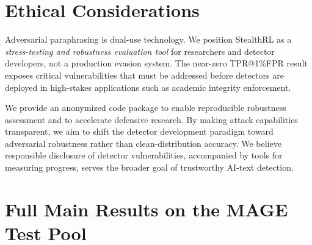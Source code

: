 \documentclass[11pt]{article}
\begin{document}
\section{Ethical Considerations}

Adversarial paraphrasing is dual-use technology. We position StealthRL as a \emph{stress-testing and robustness evaluation tool} for researchers and detector developers, not a production evasion system. The near-zero TPR@1\%FPR result exposes critical vulnerabilities that must be addressed before detectors are deployed in high-stakes applications such as academic integrity enforcement.

We provide an anonymized code package to enable reproducible robustness assessment and to accelerate defensive research. By making attack capabilities transparent, we aim to shift the detector development paradigm toward adversarial robustness rather than clean-distribution accuracy. We believe responsible disclosure of detector vulnerabilities, accompanied by tools for measuring progress, serves the broader goal of trustworthy AI-text detection.



\appendix

\section{Full Main Results on the MAGE Test Pool}
\label{app:mainresults}

\begin{center}
\small
\setlength{\tabcolsep}{4pt}
\resizebox{\columnwidth}{!}{%
  
}
\label{tab:app_main_binoc}
\end{center}

\begin{center}
\small
\setlength{\tabcolsep}{4pt}
\resizebox{\columnwidth}{!}{%
  
}
\label{tab:app_main_fastd}
\end{center}
\end{document}
